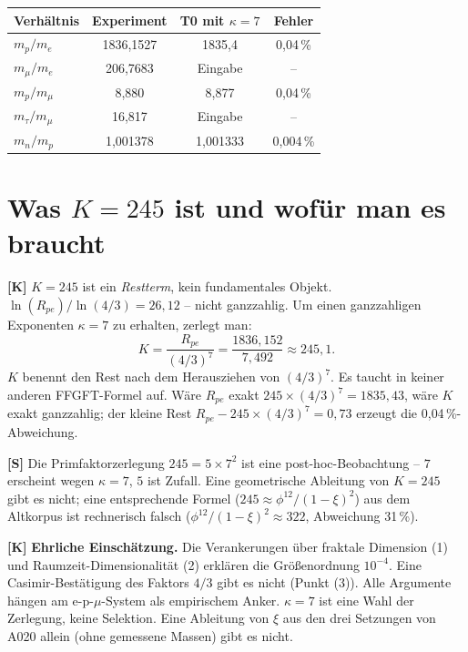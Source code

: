 \begin{center}
\renewcommand{\arraystretch}{1.3}
{\small
\begin{tabular}{lccc}
\toprule
Verhältnis & Experiment & T0 mit $\kappa=7$ & Fehler \\
\midrule
$m_p/m_e$       & 1836{,}1527 & 1835{,}4 & 0{,}04\,\% \\
$m_\mu/m_e$     & 206{,}7683  & Eingabe & -- \\
$m_p/m_\mu$     & 8{,}880     & 8{,}877 & 0{,}04\,\% \\
$m_\tau/m_\mu$  & 16{,}817    & Eingabe & -- \\
$m_n/m_p$       & 1{,}001378  & 1{,}001333 & 0{,}004\,\% \\
\bottomrule
\end{tabular}
}
\renewcommand{\arraystretch}{1.0}
\end{center}

\section{Was $K = 245$ ist und wofür man es braucht}

\textbf{[K]} $K=245$ ist ein \emph{Restterm}, kein fundamentales Objekt.
$\ln(R_{pe})/\ln(4/3) = 26{,}12$ -- nicht ganzzahlig. Um einen ganzzahligen
Exponenten $\kappa=7$ zu erhalten, zerlegt man:
\[
  K = \frac{R_{pe}}{(4/3)^7}
  = \frac{1836{,}152}{7{,}492} \approx 245{,}1.
\]
$K$ benennt den Rest nach dem Herausziehen von $(4/3)^7$. Es taucht in keiner
anderen FFGFT-Formel auf. Wäre $R_{pe}$ exakt $245\times(4/3)^7=1835{,}43$,
wäre $K$ exakt ganzzahlig; der kleine Rest $R_{pe}-245\times(4/3)^7=0{,}73$
erzeugt die 0{,}04\,\%-Abweichung.

\textbf{[S]} Die Primfaktorzerlegung $245=5\times7^2$ ist eine
post-hoc-Beobachtung -- $7$ erscheint wegen $\kappa=7$, $5$ ist Zufall.
Eine geometrische Ableitung von $K=245$ gibt es nicht; eine entsprechende
Formel ($245\approx\phi^{12}/(1-\xi)^2$) aus dem Altkorpus ist rechnerisch
falsch ($\phi^{12}/(1-\xi)^2\approx322$, Abweichung 31\,\%).

\textbf{[K]} \textbf{Ehrliche Einschätzung.} Die Verankerungen über fraktale
Dimension (1) und Raumzeit-Dimensionalität (2) erklären die Größenordnung $10^{-4}$.
Eine Casimir-Bestätigung des Faktors $4/3$ gibt es nicht (Punkt (3)). Alle Argumente
hängen am e-p-$\mu$-System als empirischem Anker. $\kappa=7$ ist eine Wahl der
Zerlegung, keine Selektion. Eine Ableitung von $\xi$ aus den drei Setzungen von A020
allein (ohne gemessene Massen) gibt es nicht.


